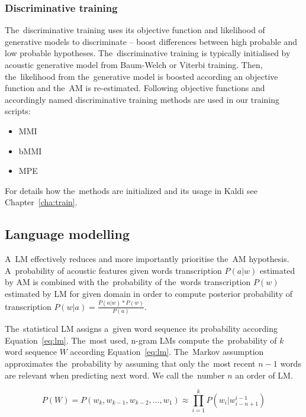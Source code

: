 \subsubsection*{Discriminative training}
\label{sub:subsection_name}
The~discriminative training uses its objective function and likelihood of generative models to discriminate -- boost differences between high probable and low probable hypotheses.
The~discriminative training is typically initialised by acoustic generative model from Baum-Welch or Viterbi training.
Then, the~likelihood from the~generative model is boosted according an objective function and the~\ac{AM} is re-estimated.
Following objective functions and accordingly named discriminative training methods are used in our training scripts:
\begin{itemize}
    \item \acl{MMI}\cite{chow1990maximum} 
    \item \acl{bMMI}\cite{povey2008boosted}
    \item \acl{MPE}\cite{povey2003mmi}
\end{itemize}
For details how the~methods are initialized and its usage in Kaldi see Chapter~\ref{cha:train}.

\subsection{Language modelling}
\label{sub:lm}

A~\acl{LM} effectively reduces and more importantly prioritise the~\ac{AM} hypothesis.
A~probability of acoustic features given words transcription $P(a|w)$ estimated by \ac{AM} is combined with the~probability of the~words transcription $P(w)$ estimated by \ac{LM} for given domain in order to compute posterior probability of transcription $P(w|a) = \frac{P(a|w)*P(w)}{P(a)}$.

The~statistical \ac{LM} assigns a~given word sequence its probability according Equation~\ref{eq:lm}.
The~most used, n-gram \acp{LM} compute the~probability of $k$ word sequence $W$ according Equation~\ref{eq:lm}.\cite{brants2007large}
The~Markov assumption approximates the~probability by assuming that only the~most recent $n-1$ words are relevant when predicting next word.
We call the~number $n$ an order of \ac{LM}.

\begin{equation} \label{eq:lm}
    P(W)=P(w_k,  w_{k-1}, w_{k-2}, ..., w_1) \approx \prod_{i=1}^{k}{P(w_i|w^{i-1}_{i-n+1})}
\end{equation}

